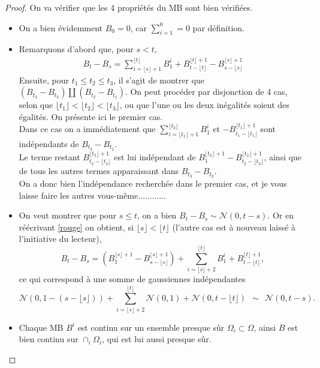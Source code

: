 \documentclass{article}
\theoremstyle{definition}
\numberwithin{equation}{section}
\begin{document}
\begin{proof}
On va vérifier que les 4 propriétés du MB sont bien vérifiées.
\begin{itemize}
    \item[(1)] On a bien évidemment $B_0=0$, car $\sum_{i=1}^0=0$ par définition.
    \item[(2)] Remarquons d'abord que, pour $s<t$, 
    \begin{align}
    \label{rouge}
    B_t-B_s = \sum_{i=\lfloor s \rfloor + 1}^{\lfloor t \rfloor} B^i_1 + B_{t-\lfloor t \rfloor}^{\lfloor t \rfloor + 1} - B_{s-\lfloor s \rfloor}^{\lfloor s \rfloor + 1}
    \end{align}
    Ensuite, pour $t_1 \leq t_2 \leq t_3$, il s'agit de montrer que $(B_{t_3}-B_{t_2}) \amalg (B_{t_2}-B_{t_1})$. On peut procéder par disjonction de 4 cas, selon que $\lfloor t_1\rfloor < \lfloor t_2\rfloor < \lfloor t_3\rfloor$, ou que l'une ou les deux inégalités soient des égalités. On présente ici le premier cas.\\
    Dans ce cas on a immédiatement que $\sum_{i=\lfloor t_1 \rfloor+1}^{\lfloor t_2\rfloor} B_1^i$ et $-B^{\lfloor t_1\rfloor+1}_{t_1-\lfloor t_1\rfloor}$ sont indépendants de $B_{t_3}-B_{t_2}$.\\
    Le terme restant $B_{t_2-\lfloor t_2\rfloor}^{\lfloor t_2\rfloor+1}$ est lui indépendant de $B_1^{\lfloor t_2\rfloor+1}-B_{t_2-\lfloor t_2\rfloor}^{\lfloor t_2\rfloor +1}$, ainsi que de tous les autres termes apparaissant dans $B_{t_3}-B_{t_2}$.\\
    On a donc bien l'indépendance recherchée dans le premier cas, et je vous laisse faire les autres vous-même............
    \item[(3)] On veut montrer que pour $s\leq t$, on a bien $B_t-B_s \sim \mathcal{N}(0,t-s)$. Or en réécrivant \eqref{rouge} on obtient, si $\lfloor s \rfloor < \lfloor t \rfloor$ (l'autre cas est à nouveau laissé à l'initiative du lecteur),
    $$ B_t-B_s = (B^{\lfloor s \rfloor +1}_1-B^{\lfloor s \rfloor +1}_{s-\lfloor s \rfloor}) + \sum_{i=\lfloor s \rfloor + 2}^{\lfloor t \rfloor} B^i_1 + B_{t-\lfloor t \rfloor}^{\lfloor t \rfloor + 1}, $$
    ce qui correspond à une somme de gaussiennes indépendantes
    $$ \mathcal{N}(0,1-(s-\lfloor s \rfloor)) + \sum_{i=\lfloor s \rfloor + 2}^{\lfloor t \rfloor} \mathcal{N}(0,1) + \mathcal{N}(0,t-\lfloor t \rfloor) ~~\sim~~ \mathcal{N}(0,t-s). $$
    \item[(4)] Chaque MB $B^i$ est continu sur un ensemble presque sûr $\Omega_i\subset \Omega$, ainsi $B$ est bien continu sur $\cap_i \Omega_i$, qui est lui aussi presque sûr.
\end{itemize}
\end{proof}
\end{document}
